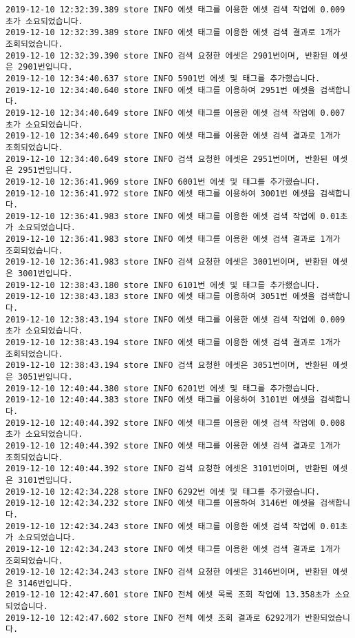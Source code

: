 \begin{Verbatim}[fontsize=\tiny, breaklines=true, breakanywhere=true]
2019-12-10 12:32:39.389 store INFO 에셋 태그를 이용한 에셋 검색 작업에 0.009초가 소요되었습니다.
2019-12-10 12:32:39.389 store INFO 에셋 태그를 이용한 에셋 검색 결과로 1개가 조회되었습니다.
2019-12-10 12:32:39.390 store INFO 검색 요청한 에셋은 2901번이며, 반환된 에셋은 2901번입니다.
2019-12-10 12:34:40.637 store INFO 5901번 에셋 및 태그를 추가했습니다.
2019-12-10 12:34:40.640 store INFO 에셋 태그를 이용하여 2951번 에셋을 검색합니다.
2019-12-10 12:34:40.649 store INFO 에셋 태그를 이용한 에셋 검색 작업에 0.007초가 소요되었습니다.
2019-12-10 12:34:40.649 store INFO 에셋 태그를 이용한 에셋 검색 결과로 1개가 조회되었습니다.
2019-12-10 12:34:40.649 store INFO 검색 요청한 에셋은 2951번이며, 반환된 에셋은 2951번입니다.
2019-12-10 12:36:41.969 store INFO 6001번 에셋 및 태그를 추가했습니다.
2019-12-10 12:36:41.972 store INFO 에셋 태그를 이용하여 3001번 에셋을 검색합니다.
2019-12-10 12:36:41.983 store INFO 에셋 태그를 이용한 에셋 검색 작업에 0.01초가 소요되었습니다.
2019-12-10 12:36:41.983 store INFO 에셋 태그를 이용한 에셋 검색 결과로 1개가 조회되었습니다.
2019-12-10 12:36:41.983 store INFO 검색 요청한 에셋은 3001번이며, 반환된 에셋은 3001번입니다.
2019-12-10 12:38:43.180 store INFO 6101번 에셋 및 태그를 추가했습니다.
2019-12-10 12:38:43.183 store INFO 에셋 태그를 이용하여 3051번 에셋을 검색합니다.
2019-12-10 12:38:43.194 store INFO 에셋 태그를 이용한 에셋 검색 작업에 0.009초가 소요되었습니다.
2019-12-10 12:38:43.194 store INFO 에셋 태그를 이용한 에셋 검색 결과로 1개가 조회되었습니다.
2019-12-10 12:38:43.194 store INFO 검색 요청한 에셋은 3051번이며, 반환된 에셋은 3051번입니다.
2019-12-10 12:40:44.380 store INFO 6201번 에셋 및 태그를 추가했습니다.
2019-12-10 12:40:44.383 store INFO 에셋 태그를 이용하여 3101번 에셋을 검색합니다.
2019-12-10 12:40:44.392 store INFO 에셋 태그를 이용한 에셋 검색 작업에 0.008초가 소요되었습니다.
2019-12-10 12:40:44.392 store INFO 에셋 태그를 이용한 에셋 검색 결과로 1개가 조회되었습니다.
2019-12-10 12:40:44.392 store INFO 검색 요청한 에셋은 3101번이며, 반환된 에셋은 3101번입니다.
2019-12-10 12:42:34.228 store INFO 6292번 에셋 및 태그를 추가했습니다.
2019-12-10 12:42:34.232 store INFO 에셋 태그를 이용하여 3146번 에셋을 검색합니다.
2019-12-10 12:42:34.243 store INFO 에셋 태그를 이용한 에셋 검색 작업에 0.01초가 소요되었습니다.
2019-12-10 12:42:34.243 store INFO 에셋 태그를 이용한 에셋 검색 결과로 1개가 조회되었습니다.
2019-12-10 12:42:34.243 store INFO 검색 요청한 에셋은 3146번이며, 반환된 에셋은 3146번입니다.
2019-12-10 12:42:47.601 store INFO 전체 에셋 목록 조회 작업에 13.358초가 소요되었습니다.
2019-12-10 12:42:47.602 store INFO 전체 에셋 조회 결과로 6292개가 반환되었습니다.

\end{Verbatim}
